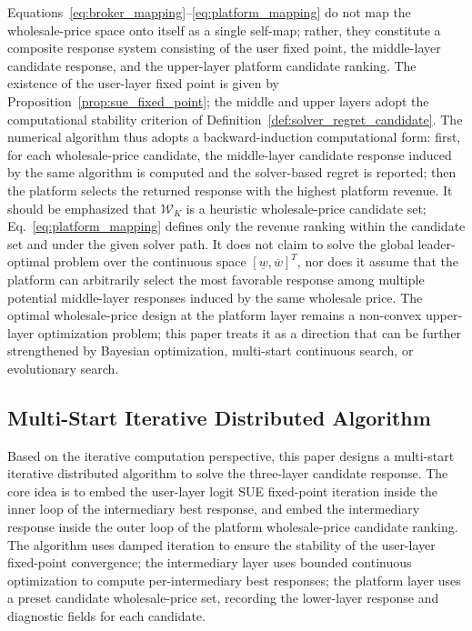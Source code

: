 \documentclass[11pt,a4paper]{article}
\begin{document}
Equations~\eqref{eq:broker_mapping}--\eqref{eq:platform_mapping} do not map the wholesale-price space onto itself as a single self-map; rather, they constitute a composite response system consisting of the user fixed point, the middle-layer candidate response, and the upper-layer platform candidate ranking. The existence of the user-layer fixed point is given by Proposition~\ref{prop:sue_fixed_point}; the middle and upper layers adopt the computational stability criterion of Definition~\ref{def:solver_regret_candidate}. The numerical algorithm thus adopts a backward-induction computational form: first, for each wholesale-price candidate, the middle-layer candidate response induced by the same algorithm is computed and the solver-based regret is reported; then the platform selects the returned response with the highest platform revenue. It should be emphasized that $\mathcal{W}_K$ is a heuristic wholesale-price candidate set; Eq.~\eqref{eq:platform_mapping} defines only the revenue ranking within the candidate set and under the given solver path. It does not claim to solve the global leader-optimal problem over the continuous space $[\underline w,\overline w]^T$, nor does it assume that the platform can arbitrarily select the most favorable response among multiple potential middle-layer responses induced by the same wholesale price. The optimal wholesale-price design at the platform layer remains a non-convex upper-layer optimization problem; this paper treats it as a direction that can be further strengthened by Bayesian optimization, multi-start continuous search, or evolutionary search.

\subsection{Multi-Start Iterative Distributed Algorithm}
\label{sec:algorithm}

Based on the iterative computation perspective, this paper designs a multi-start iterative distributed algorithm to solve the three-layer candidate response. The core idea is to embed the user-layer logit SUE fixed-point iteration inside the inner loop of the intermediary best response, and embed the intermediary response inside the outer loop of the platform wholesale-price candidate ranking. The algorithm uses damped iteration to ensure the stability of the user-layer fixed-point convergence; the intermediary layer uses bounded continuous optimization to compute per-intermediary best responses; the platform layer uses a preset candidate wholesale-price set, recording the lower-layer response and diagnostic fields for each candidate.
\end{document}
